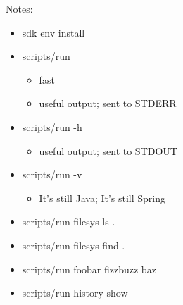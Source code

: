 \begin{frame}[label=all]
{            Notes:
            \begin{itemize}
               \item{sdk env install}
               \item{
                     scripts/run
                     \begin{itemize}
                        \item{fast}
                        \item{useful output; sent to STDERR}
                     \end{itemize}
                  }
               \item{
                     scripts/run -h
                     \begin{itemize}
                        \item{useful output; sent to STDOUT}
                     \end{itemize}
                  }
               \item{
                     scripts/run -v
                     \begin{itemize}
                        \item{It's still Java; It's still Spring}
                     \end{itemize}
                  }
               \item{scripts/run filesys ls .}
               \item{scripts/run filesys find .}
               \item{scripts/run foobar fizzbuzz baz}
               \item{scripts/run history show}
            \end{itemize}
        }
    \end{frame}
%
